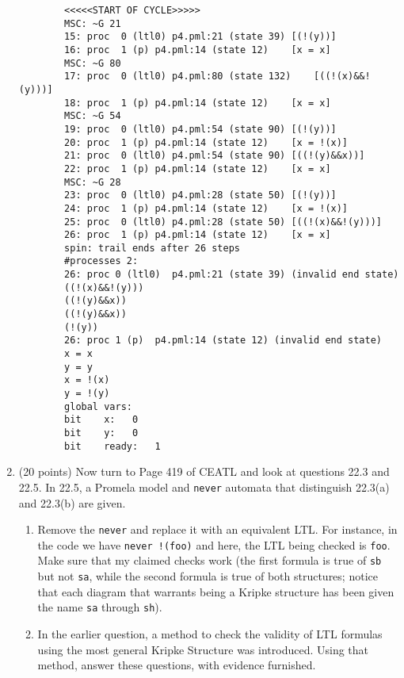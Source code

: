 \documentclass[11pt]{article}
\begin{document}
\begin{enumerate}
\begin{scriptsize}
\begin{verbatim}
        <<<<<START OF CYCLE>>>>>
        MSC: ~G 21
        15:	proc  0 (ltl0) p4.pml:21 (state 39)	[(!(y))]
        16:	proc  1 (p) p4.pml:14 (state 12)	[x = x]
        MSC: ~G 80
        17:	proc  0 (ltl0) p4.pml:80 (state 132)	[((!(x)&&!(y)))]
        18:	proc  1 (p) p4.pml:14 (state 12)	[x = x]
        MSC: ~G 54
        19:	proc  0 (ltl0) p4.pml:54 (state 90)	[(!(y))]
        20:	proc  1 (p) p4.pml:14 (state 12)	[x = !(x)]
        21:	proc  0 (ltl0) p4.pml:54 (state 90)	[((!(y)&&x))]
        22:	proc  1 (p) p4.pml:14 (state 12)	[x = x]
        MSC: ~G 28
        23:	proc  0 (ltl0) p4.pml:28 (state 50)	[(!(y))]
        24:	proc  1 (p) p4.pml:14 (state 12)	[x = !(x)]
        25:	proc  0 (ltl0) p4.pml:28 (state 50)	[((!(x)&&!(y)))]
        26:	proc  1 (p) p4.pml:14 (state 12)	[x = x]
        spin: trail ends after 26 steps
        #processes 2:
        26:	proc 0 (ltl0)  p4.pml:21 (state 39) (invalid end state)
        ((!(x)&&!(y)))
        ((!(y)&&x))
        ((!(y)&&x))
        (!(y))
        26:	proc 1 (p)  p4.pml:14 (state 12) (invalid end state)
        x = x
        y = y
        x = !(x)
        y = !(y)
        global vars:
        bit    x:	0
        bit    y:	0
        bit    ready:	1
\end{verbatim}
\end{scriptsize}


\clearpage
  


\item (20 points) 
  Now turn to Page 419 of CEATL and look at questions 22.3 and 22.5.
  In 22.5, a Promela model and {\tt never} automata
  that distinguish 22.3(a) and 22.3(b) are given.
  \begin{enumerate}
  \item Remove the {\tt never} and replace it with an equivalent LTL.
    For instance, in the code we have {\tt never !(foo)} and here,
    the LTL being checked is {\tt foo}.
    Make sure that my claimed checks work (the first formula is true
    of {\tt sb} but not {\tt sa}, while the second formula is true
    of both structures; notice that each diagram
    that warrants being a Kripke structure has been given the name
    {\tt sa} through {\tt sh}).

  \item In the earlier question,
    a method to check the validity of LTL
    formulas using the most general Kripke Structure was introduced.
    Using that method, answer these questions, with evidence furnished.


\end{enumerate}
\end{enumerate}
\end{document}
